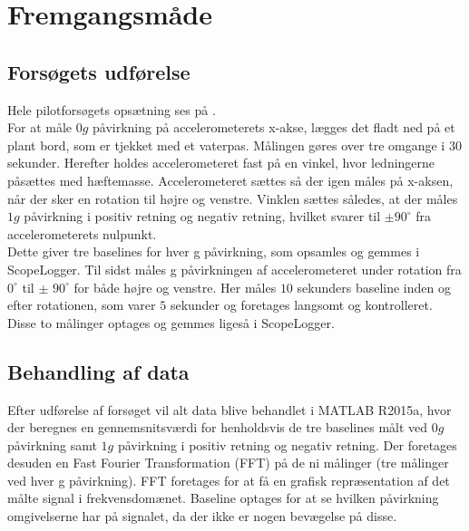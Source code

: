 \section{Fremgangsmåde}
\subsection{Forsøgets udførelse}
Hele pilotforsøgets opsætning ses på . \\
For at måle $0g$ påvirkning på accelerometerets x-akse, lægges det fladt ned på et plant bord, som er tjekket med et vaterpas. Målingen gøres over tre omgange i $30$ sekunder. Herefter holdes accelerometeret fast på en vinkel, hvor ledningerne påsættes med hæftemasse. Accelerometeret sættes så der igen måles på x-aksen, når der sker en rotation til højre og venstre. Vinklen sættes således, at der måles $1g$ påvirkning i positiv retning og negativ retning, hvilket svarer til $\pm90^{\circ}$ fra accelerometerets nulpunkt. \\
Dette giver tre baselines for hver g påvirkning, som opsamles og gemmes i ScopeLogger. %
Til sidst måles g påvirkningen af accelerometeret under rotation fra $0^{\circ}$ til $\pm$ $90^{\circ}$ for både højre og venstre. Her måles $10$ sekunders baseline inden og efter rotationen, som varer $5$ sekunder og foretages langsomt og kontrolleret. Disse to målinger optages og gemmes ligeså i ScopeLogger. \\
\subsection{Behandling af data}
Efter udførelse af forsøget vil alt data blive behandlet i MATLAB R2015a, hvor der beregnes en gennemsnitsværdi for henholdsvis de tre baselines målt ved $0g$ påvirkning samt $1g$ påvirkning i positiv retning og negativ retning. Der foretages desuden en Fast Fourier Transformation (FFT) på de ni målinger (tre målinger ved hver g påvirkning). FFT foretages for at få en grafisk repræsentation af det målte signal i frekvensdomænet. Baseline optages for at se hvilken påvirkning omgivelserne har på signalet, da der ikke er nogen bevægelse på disse.

